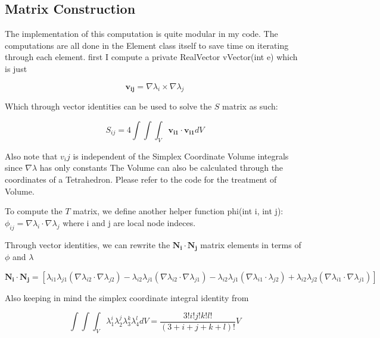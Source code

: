 \documentclass[11pt,a4paper,oldfontcommands]{memoir}
\begin{document}
\subsection{Matrix Construction}

The implementation of this computation is quite modular in my code. The computations are all done in the Element class itself to save time on iterating through each element. first I compute a private RealVector vVector(int e) which is just

\begin{equation} \label{eq:8}
\mathbf{v_{ij}} = \nabla\lambda_i \times \nabla\lambda_j
\end{equation}

Which through vector identities can be used to solve the $S$ matrix as such:

\begin{equation} \label{eq:9}
S_{ij} = 4\int\int\int_V \mathbf{v_{i1}} \cdot \mathbf{v_{i1}} dV
\end{equation}

Also note that $v_ij$ is independent of the  Simplex Coordinate Volume integrals since $\nabla\lambda$ has only constants
The Volume can also be calculated through the coordinates of a Tetrahedron. Please refer to the code for the treatment of Volume.

To compute the $T$ matrix, we define another helper function phi(int i, int j): $\phi_{ij} = \nabla \lambda_i \cdot \nabla \lambda_j$ where i and j are local node indeces.

Through vector identities, we can rewrite the $\mathbf{N_i}\cdot \mathbf{N_j}$ matrix elements in terms of $\phi$ and $\lambda$

\begin{equation} \label{eq:9}
\mathbf{N_i}\cdot \mathbf{N_j} = [\lambda_{i1}\lambda_{j1}(\nabla\lambda_{i2} \cdot \nabla\lambda_{j2}) - \lambda_{i2}\lambda_{j1}(\nabla\lambda_{i2}\cdot\nabla\lambda_{j1}) - \lambda_{i2}\lambda_{j1}(\nabla\lambda_{i1}\cdot\lambda_{j2}) + \lambda_{i2}\lambda_{j2}(\nabla\lambda_{i1} \cdot \nabla\lambda_{j1})]
\end{equation}

Also keeping in mind the simplex coordinate integral identity from ~\cite{Jin}


\begin{equation} \label{eq:9}
\int\int\int_{V} \lambda_{1}^{i}\lambda_{2}^{j}\lambda_{3}^{k}\lambda_{4}^{l} dV = \frac{3!i!j!k!l!}{(3+i+j+k+l)!}V
\end{equation}
\end{document}

